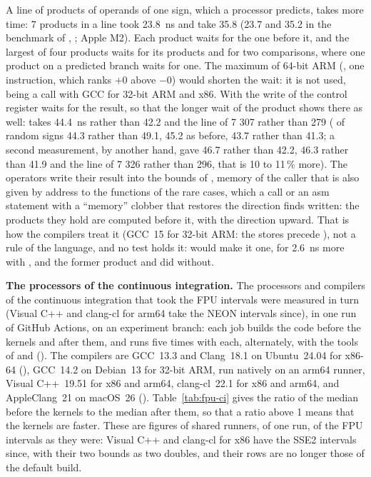 \documentclass[12pt,a4paper,twoside,openright]{book}
\begin{document}
\medskip
A line of products of operands of one sign, which a processor predicts, takes
more time: 7 products in a line took 23.8~ns and take 35.8 (23.7 and 35.2 in
the benchmark of , ; Apple M2). Each
product waits for the one before it, and the largest of four products waits
for its products and for two comparisons, where one product on a predicted
branch waits for one. The maximum of 64-bit ARM (, one
instruction, which ranks $+0$ above $-0$) would shorten the wait: it is not
used, being a call with GCC for 32-bit ARM and x86. With
 the write of the control register waits for
the result, so that the longer wait of the product shows there as well:
 takes 44.4~ns rather than 42.2 and the line of 7 \code{*} 307
rather than 279 ( of random signs 44.3 rather than 49.1,
 45.2 as before,  43.7 rather than 41.3; a second
measurement, by another hand, gave  46.7 rather than 42.2,
 46.3 rather than 41.9 and the line of 7 \code{*} 326 rather
than 296, that is 10 to 11\,\% more). The operators write their result into
the bounds of , memory of the caller that is also given by address
to the functions of the rare cases, which a call or an asm statement with a
``memory'' clobber that restores the direction finds written: the products
they hold are computed before it, with the direction upward. That is how the
compilers treat it (GCC~15 for 32-bit ARM: the stores precede
), not a rule of the language, and no test holds it:
 would make it one, for 2.6~ns more with
, and the former product and 
did without.

\medskip
\noindent
\textbf{The processors of the continuous integration.} The processors and
compilers of the continuous integration that took the FPU intervals were
measured in turn (Visual C++ and clang-cl for arm64 take the NEON intervals
since),\newinvfive{} in one run of GitHub Actions, on an experiment branch:
each job builds the code before the kernels and after them, and runs
 five times with each, alternately, with the tools of
 and 
(). The compilers are GCC~13.3 and Clang~18.1 on
Ubuntu~24.04 for x86-64 (), GCC~14.2 on Debian~13
for 32-bit ARM, run natively on an arm64 runner, Visual C++~19.51 for x86 and
arm64, clang-cl~22.1 for x86 and arm64, and AppleClang~21 on macOS~26
(). Table~\ref{tab:fpu-ci} gives the ratio of the
median before the kernels to the median after them, so that a ratio above 1
means that the kernels are faster. These are figures of shared runners, of
one run, of the FPU intervals as they were: Visual C++ and clang-cl for x86
have the SSE2 intervals since,\newinvfive{} with their two bounds as two
doubles, and their rows are no longer those of the default build.
\end{document}
